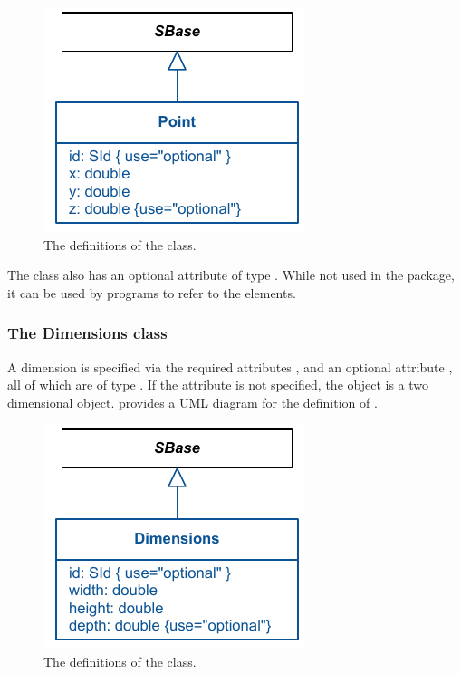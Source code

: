 \begin{figure}[hbt]
  \includegraphics{uml/layout-point-uml}
  \caption{The definitions of the \Point class.}
  \label{uml:point}
\end{figure}

The \Point class also has an optional attribute  of type 
. While not used in the \Layout package, it can be used 
by programs to refer to the elements. 

\subsubsection{The Dimensions class} \label{dimensions-class} A 
dimension is specified via the required attributes , 
 and an optional attribute , all of which are 
of type . If the attribute  is not 
specified, the object is a two dimensional object.  
provides a UML diagram for the definition of \Dimensions.

\begin{figure}[htb]
  \includegraphics{uml/layout-dimensions-uml}
  \caption{The definitions of the \Dimensions class.}
  \label{uml:dimensions}
\end{figure}


